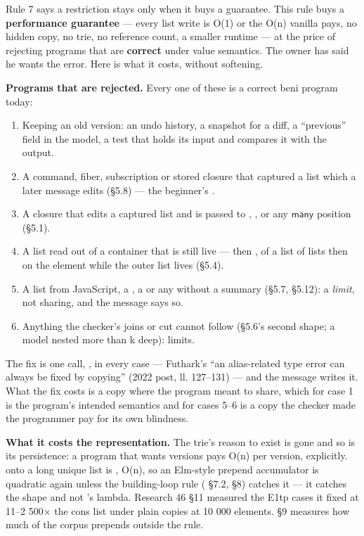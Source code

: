 
Rule 7 says a restriction stays only when it buys a guarantee. This rule buys a \textbf{performance guarantee} — every list write is O(1) or the O(n) vanilla pays, no hidden copy, no trie, no reference count, a smaller runtime — at the price of rejecting programs that are \textbf{correct} under value semantics. The owner has said he wants the error. Here is what it costs, without softening.

\textbf{Programs that are rejected.} Every one of these is a correct beni program today:

\begin{enumerate}
\item Keeping an old version: an undo history, a snapshot for a diff, a “previous” field in the model, a test that holds its input and compares it with the output.
\item A command, fiber, subscription or stored closure that captured a list which a later message edits (§5.8) — the beginner's .
\item A closure that edits a captured list and is passed to , ,  or any $\mathsf{many}$ position (§5.1).
\item A list read out of a container that is still live —  then ,  of a list of lists then  on the element while the outer list lives (§5.4).
\item A list from JavaScript, a , a  or any  without a summary (§5.7, §5.12): a \emph{limit}, not sharing, and the message says so.
\item Anything the checker's joins or cut cannot follow (§5.6's second shape; a model nested more than k deep): limits.
\end{enumerate}

The fix is one call, , in every case — Futhark's “an alias-related type error can always be fixed by copying” (2022 post, ll. 127–131) — and the message writes it. What the fix costs is a copy where the program meant to share, which for case 1 is the program's intended semantics and for cases 5–6 is a copy the checker made the programmer pay for its own blindness.

\textbf{What it costs the representation.} The trie's reason to exist is gone and so is its persistence: a program that wants versions pays O(n) per version, explicitly. \code{[ x, …xs ]} onto a long unique list is , O(n), so an Elm-style prepend accumulator is quadratic again unless the building-loop rule ( §7.2,  §8) catches it — it catches the  shape and not 's lambda. Research 46 §11 measured the E1tp cases it fixed at 11–2 500× the cons list under plain copies at 10 000 elements. §9 measures how much of the corpus prepends outside the rule.

